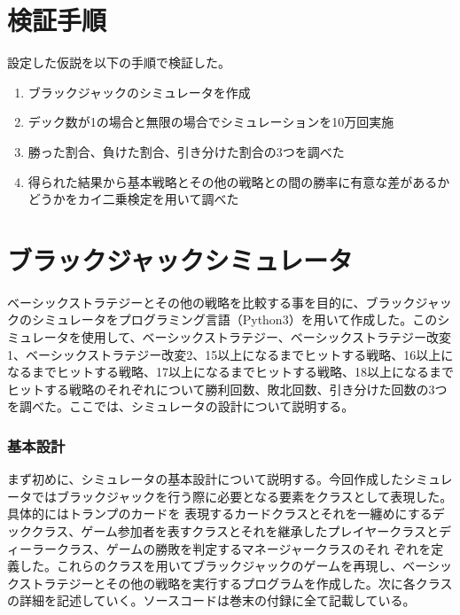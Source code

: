 \section{検証手順}
設定した仮説を以下の手順で検証した。
\begin{enumerate}
\item ブラックジャックのシミュレータを作成
\item デック数が1の場合と無限の場合でシミュレーションを10万回実施
\item 勝った割合、負けた割合、引き分けた割合の3つを調べた
\item 得られた結果から基本戦略とその他の戦略との間の勝率に有意な差があるかどうかをカイ二乗検定を用いて調べた
\end{enumerate}

\section{ブラックジャックシミュレータ}
ベーシックストラテジーとその他の戦略を比較する事を目的に、ブラックジャックのシミュレータをプログラミング言語（Python3）を用いて作成した。このシミュレータを使用して、ベーシックストラテジー、ベーシックストラテジー改変1、ベーシックストラテジー改変2、15以上になるまでヒットする戦略、16以上になるまでヒットする戦略、17以上になるまでヒットする戦略、18以上になるまでヒットする戦略のそれぞれについて勝利回数、敗北回数、引き分けた回数の3つを調べた。ここでは、シミュレータの設計について説明する。



\subsubsection{基本設計}
まず初めに、シミュレータの基本設計について説明する。今回作成したシミュレータではブラックジャックを行う際に必要となる要素をクラスとして表現した。具体的にはトランプのカードを
表現するカードクラスとそれを一纏めにするデッククラス、ゲーム参加者を表すクラスとそれを継承したプレイヤークラスとディーラークラス、ゲームの勝敗を判定するマネージャークラスのそれ
ぞれを定義した。これらのクラスを用いてブラックジャックのゲームを再現し、ベーシックストラテジーとその他の戦略を実行するプログラムを作成した。次に各クラスの詳細を記述していく。ソースコードは巻末の付録に全て記載している。

